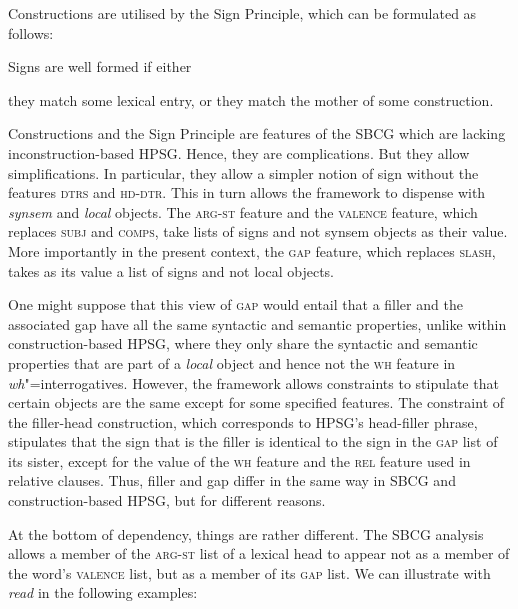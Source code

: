 \documentclass[output=paper
	        ,collection
	        ,collectionchapter
 	        ,biblatex
                ,babelshorthands
                ,newtxmath
                ,draftmode
                ,colorlinks, citecolor=brown
]{langscibook}
\begin{document}
{\begin{exe}
\end{exe}
\noindent
Constructions are utilised by the Sign Principle, which can be
formulated as follows:

\begin{exe}
  \ex \label{ex:UDC:SBCG:SignPrinciple} Signs are well formed if either

  \begin{xlist}
    \ex they match some lexical entry, or \ex they match the mother of
    some construction.
  \end{xlist}
\end{exe}

\noindent
Constructions and the Sign Principle are features of the SBCG which
are lacking inconstruction-based HPSG. Hence, they are
complications. But they allow simplifications. In particular, they
allow a simpler notion of sign without the features \textsc{dtrs} and
\textsc{hd-dtr}. This in turn allows the framework to dispense with
\textit{synsem} and \textit{local} objects. The \textsc{arg-st}
feature and the \textsc{valence} feature, which replaces \textsc{subj}
and \textsc{comps}, take lists of signs and not synsem objects as
their value. More importantly in the present context, the \textsc{gap}
feature, which replaces \textsc{slash}, takes as its value a list of
signs and not local objects.

One might suppose that this view of \textsc{gap} would entail that a
filler and the associated gap have all the same syntactic and semantic
properties, unlike within construction-based HPSG, where they only
share the syntactic and semantic properties that are part of a
\textit{local} object and hence not the \textsc{wh} feature in
\emph{wh}"=interrogatives. However, the framework allows constraints
to stipulate that certain objects are the same except for some
specified features. The constraint of the filler-head construction,
which corresponds to HPSG’s head-filler phrase, stipulates that the
sign that is the filler is identical to the sign in the \textsc{gap}
list of its sister, except for the value of the \textsc{wh} feature
and the \textsc{rel} feature used in relative clauses. Thus, filler
and gap differ in the same way in SBCG and construction-based HPSG,
but for different reasons.

At the bottom of dependency, things are rather different. The SBCG
analysis allows a member of the \textsc{arg-st} list of a lexical head
to appear not as a member of the word’s \textsc{valence} list, but as
a member of its \textsc{gap} list. We can illustrate with
\textit{read} in the following examples:

}
\end{document}
